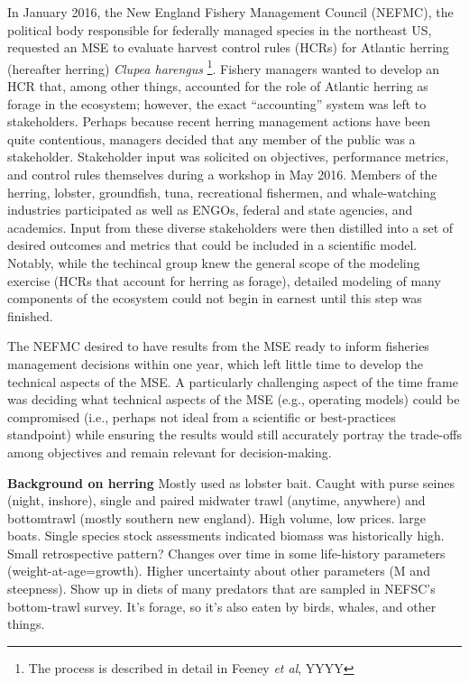 \documentclass[]{article}
\let\rmarkdownfootnote\footnote%
\def\footnote{\protect\rmarkdownfootnote}
\begin{document}
In January 2016, the New England Fishery Management Council (NEFMC), the
political body responsible for federally managed species in the
northeast US, requested an MSE to evaluate harvest control rules (HCRs)
for Atlantic herring (hereafter herring) \emph{Clupea harengus}
\footnote{The process is described in detail in Feeney \textit{et al}, YYYY}.
Fishery managers wanted to develop an HCR that, among other things,
accounted for the role of Atlantic herring as forage in the ecosystem;
however, the exact ``accounting'' system was left to stakeholders.
Perhaps because recent herring management actions have been quite
contentious, managers decided that any member of the public was a
stakeholder. Stakeholder input was solicited on objectives, performance
metrics, and control rules themselves during a workshop in May 2016.
Members of the herring, lobster, groundfish, tuna, recreational
fishermen, and whale-watching industries participated as well as ENGOs,
federal and state agencies, and academics. Input from these diverse
stakeholders were then distilled into a set of desired outcomes and
metrics that could be included in a scientific model. Notably, while the
techincal group knew the general scope of the modeling exercise (HCRs
that account for herring as forage), detailed modeling of many
components of the ecosystem could not begin in earnest until this step
was finished.

The NEFMC desired to have results from the MSE ready to inform fisheries
management decisions within one year, which left little time to develop
the technical aspects of the MSE. A particularly challenging aspect of
the time frame was deciding what technical aspects of the MSE (e.g.,
operating models) could be compromised (i.e., perhaps not ideal from a
scientific or best-practices standpoint) while ensuring the results
would still accurately portray the trade-offs among objectives and
remain relevant for decision-making.

\textbf{Background on herring} Mostly used as lobster bait. Caught with
purse seines (night, inshore), single and paired midwater trawl
(anytime, anywhere) and bottomtrawl (mostly southern new england). High
volume, low prices. large boats. Single species stock assessments
indicated biomass was historically high. Small retrospective pattern?
Changes over time in some life-history parameters
(weight-at-age=growth). Higher uncertainty about other parameters (M and
steepness). Show up in diets of many predators that are sampled in
NEFSC's bottom-trawl survey. It's forage, so it's also eaten by birds,
whales, and other things.\\
\end{document}
